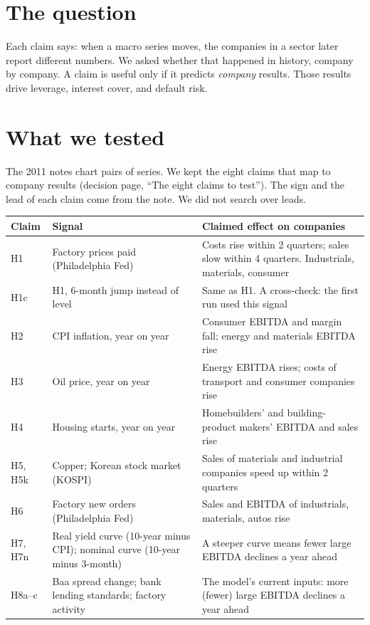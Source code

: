 \documentclass[11pt,a4paper]{article}
\begin{document}
\section*{The question}
Each claim says: when a macro series moves, the companies in a sector later report different numbers. We asked whether that happened in history, company by company. A claim is useful only if it predicts \emph{company} results. Those results drive leverage, interest cover, and default risk.

\section{What we tested}
The 2011 notes chart pairs of series. We kept the eight claims that map to company results (decision page, ``The eight claims to test''). The sign and the lead of each claim come from the note. We did not search over leads.

\begin{center}\small
\begin{tabularx}{\linewidth}{@{}l>{\raggedright}p{3.3cm}X@{}}\toprule
Claim & Signal & Claimed effect on companies \\\midrule
H1 & Factory prices paid (Philadelphia Fed) & Costs rise within 2 quarters; sales slow within 4 quarters. Industrials, materials, consumer \\
H1c & H1, 6-month jump instead of level & Same as H1. A cross-check: the first run used this signal \\
H2 & CPI inflation, year on year & Consumer EBITDA and margin fall; energy and materials EBITDA rise \\
H3 & Oil price, year on year & Energy EBITDA rises; costs of transport and consumer companies rise \\
H4 & Housing starts, year on year & Homebuilders' and building-product makers' EBITDA and sales rise \\
H5, H5k & Copper; Korean stock market (KOSPI) & Sales of materials and industrial companies speed up within 2 quarters \\
H6 & Factory new orders (Philadelphia Fed) & Sales and EBITDA of industrials, materials, autos rise \\
H7, H7n & Real yield curve (10-year minus CPI); nominal curve (10-year minus 3-month) & A steeper curve means fewer large EBITDA declines a year ahead \\
H8a--c & Baa spread change; bank lending standards; factory activity & The model's current inputs: more (fewer) large EBITDA declines a year ahead \\\bottomrule
\end{tabularx}
\end{center}
\end{document}
